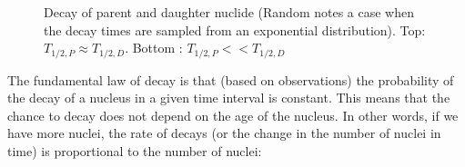 \begin{figure}[ht!]
\protect {}\protect
\caption{\label{fig:decay} \footnotesize{Decay of parent and daughter nuclide (Random notes a case when the decay times are sampled from an exponential distribution). Top: $T_{1/2,P} \approx T_{1/2,D}$. Bottom	: $T_{1/2,P} << T_{1/2,D}$}}
\end{figure}

The fundamental law of decay is that (based on observations) the probability of the decay of a nucleus in a given time interval is constant. This means that the chance to decay does not depend on the age of the nucleus. In other words, if we have more nuclei, the rate of decays (or the change in the number of nuclei in time) is proportional to the number of nuclei:

